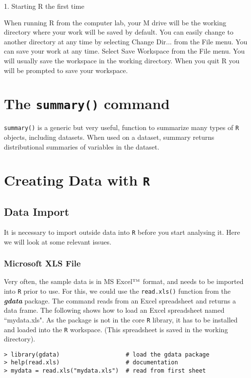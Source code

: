 \documentclass[a4paper,12pt]{article}
\begin{document}
\newpage




1. Starting R the first time


When running R from the computer lab, your M drive will be the working directory where your work will be saved by default. You can easily change to another directory at any time by selecting Change Dir... from the File menu. 
You can save your work at any time. Select Save Workspace from the File menu. You will usually save the workspace in the working directory. When you quit R you will be prompted to save your workspace. 


\section{The \texttt{summary()} command}
\texttt{summary()} is a generic but very useful, function to summarize many types of \texttt{R} objects, including datasets. When used on a dataset, summary returns distributional summaries of variables in the dataset.

\section{Creating Data with \texttt{R}}

\subsection{Data Import}
It is necessary to import outside data into \texttt{R} before you start analysing it. Here we will look at some relevant issues.

\subsubsection{Microsoft XLS File}
Very often, the sample data is in MS Excel$^{\mbox{\tiny{TM}}}$ format, and needs to be imported into \texttt{R} prior to use. For this, we could use the \texttt{read.xls()} function from the \textbf{\textit{gdata}} package. The command reads from an Excel spreadsheet and returns a data frame. The following shows how to load an Excel spreadsheet named ``mydata.xls". As the package is not in the core \texttt{R} library, it has to be installed and loaded into the \texttt{R} workspace. (This spreadsheet is saved in the working directory).
\begin{verbatim}
> library(gdata)                   # load the gdata package
> help(read.xls)                   # documentation
> mydata = read.xls("mydata.xls")  # read from first sheet
\end{verbatim}
\end{document}
